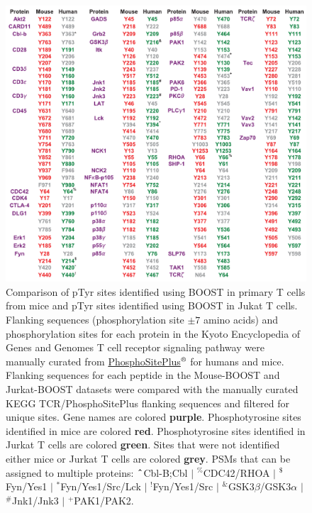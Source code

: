 \documentclass[journal=jprobs,manuscript=article]{achemso}
\newcommand\XOR{\mathbin{\char`\^}}
\begin{document}
\begin{figure}[t!]
\centering
\includegraphics[width=165mm]{figures/supplements/mouse_jurkat_keggtcr.pdf}
\caption{Comparison of pTyr sites identified using BOOST in primary T cells from mice and pTyr sites identified using BOOST in Jukat T cells. Flanking sequences (phosphorylation site $\pm7$ amino acids) and phosphorylation sites for each protein in the Kyoto Encyclopedia of Genes and Genomes T cell receptor signaling pathway were manually curated from \href{https://www.phosphosite.org}{PhosphoSitePlus$^{\text{\textregistered}}$}\cite{hornbeck2015phosphositeplus} for humans and mice. Flanking sequences for each peptide in the Mouse-BOOST and Jurkat-BOOST datasets were compared with the manually curated KEGG TCR/PhosphoSitePlus flanking sequences and filtered for unique sites. Gene names are colored \textbf{{\color{Purple}purple}}. Phosphotyrosine sites identified in mice are colored \textbf{{\color{Red}red}}. Phosphotyrosine sites identified in Jurkat T cells are colored \textbf{{\color{ForestGreen}green}}. Sites that were not identified either mice or Jurkat T cells are colored \textbf{{\color{Gray}grey}}. PSMs that can be assigned to multiple proteins: $\bm{\XOR}$Cbl-B;Cbl $|$ $^{\textbf{\%}}$CDC42/RHOA $|$ $^{\textbf{\$}}$Fyn/Yes1 $|$ $^{\textbf{*}}$Fyn/Yes1/Src/Lck $|$ $^{\textbf{!}}$Fyn/Yes1/Src $|$ $^{\textbf{\&}}$GSK3$\beta$/GSK3$\alpha$ $|$ $^{\textbf{\#}}$Jnk1/Jnk3 $|$ $^{\textbf{+}}$PAK1/PAK2. }\label{mouse_jurkat_keggtcr}
\end{figure}

\clearpage


\end{document}
